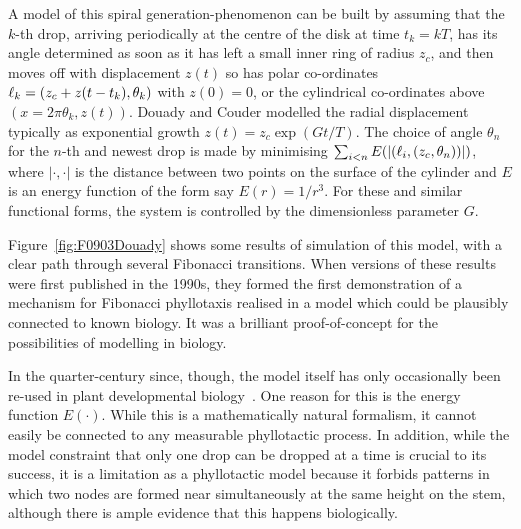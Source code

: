 
A model of this spiral generation-phenomenon  can be built by assuming that the $k$\nobreakdash-th drop, arriving periodically at the centre of the disk at time $t_k= k T$, has its angle determined as soon as it has left a small inner ring of radius $z_c$, and then moves off with displacement $z(t)$ so has polar co-ordinates $\ell_{{k}}=(z_c+z(t-t_k), \theta_k)$ with  $z(0)=0$, or the cylindrical co-ordinates above $(x=2\pi \theta_k,z(t))$. Douady and Couder modelled the radial displacement typically as exponential growth $z(t)=z_c\exp (Gt/T)$. 
 The choice of angle $\theta_n$ for the $n$-th and newest drop is made by minimising $\sum_{i<n} E(|(\ell_{{i}}, (z_c,\theta_n) )|)$, where $|\cdot,\cdot|$ is the distance  between two points on the surface of the cylinder and $E$ is an energy function of the form say $E(r)=1/r^3$.  For these and similar functional forms, the system is controlled by the dimensionless parameter $G$. 
  
  Figure~\ref{fig:F0903Douady} shows some results of simulation of this model, with a clear path through several Fibonacci transitions.  When versions of these  results were first published in the 1990s, they formed the first demonstration of a mechanism for Fibonacci phyllotaxis realised in a model which could be plausibly connected to known biology. It was a brilliant proof-of-concept for the possibilities of modelling in biology. 
  
  In the quarter-century since, though, the model itself has only occasionally   been  re-used in plant developmental biology~\cite{couderInitialTransitionsOrder1998,yonekuraMathematicalModelStudies2019}. One reason for this is the 
  energy function $E(\cdot)$. While this is a mathematically natural formalism, it cannot easily be connected to any measurable phyllotactic process. In addition, while the model constraint that only one drop can be dropped at a time is crucial to its success, it is a limitation as a phyllotactic model because it forbids patterns in which two nodes are formed near simultaneously at the same height on the stem, although there is ample evidence that this happens biologically. 
  
